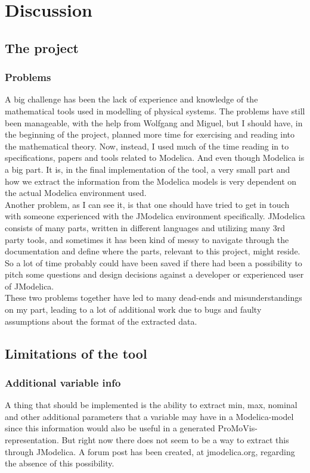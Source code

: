 \section{Discussion}
\subsection{The project}
\subsubsection{Problems}
A big challenge has been the lack of experience and knowledge of the mathematical tools used in modelling of physical systems. The problems have still been manageable, with the help from Wolfgang and Miguel, but I should have, in the beginning of the project, planned more time for exercising and reading into the mathematical theory. Now, instead, I used much of the time reading in to specifications, papers and tools related to Modelica. And even though Modelica is a big part. It is, in the final implementation of the tool, a very small part and how we extract the information from the Modelica models is very dependent on the actual Modelica environment used.\\\newline Another problem, as I can see it, is that one should have tried to get in touch with someone experienced with the JModelica environment specifically. JModelica consists of many parts, written in different languages and utilizing many 3rd party tools, and sometimes it has been kind of messy to navigate through the documentation and define where the parts, relevant to this project, might reside. So a lot of time probably could have been saved if there had been a possibility to pitch some questions and design decisions against a developer or experienced user of JModelica.\\\newline These two problems together have led to many dead-ends and misunderstandings on my part, leading to a lot of additional work due to bugs and faulty assumptions about the format of the extracted data.
\subsection{Limitations of the tool}
\subsubsection{Additional variable info}
A thing that should be implemented is the ability to extract min, max, nominal and other additional parameters that a variable may have in a Modelica-model since this information would also be useful in a generated ProMoVis-representation. But right now there does not seem to be a way to extract this through JModelica. A forum post has been created, at jmodelica.org, regarding the absence of this possibility.
